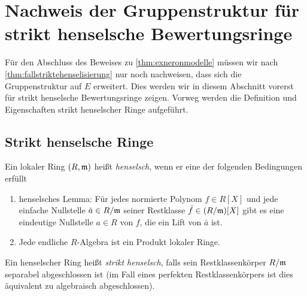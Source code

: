 \documentclass[german, bibliography=totoc]{scrreprt}
\renewcommand*{\optcite}[2][]{}
\begin{document}
\section[Gruppenstruktur für strikt henselsche Ringe]%
{Nachweis der Gruppenstruktur für strikt henselsche Bewertungsringe}
\label{chap:gruppestrikthenselsch}
Für den Abschluss des Beweises zu \ref{thm:exneronmodelle} müssen wir
nach \ref{thm:fallstriktehenselisierung} nur noch nachweisen, dass
sich die Gruppenstruktur auf $E$ erweitert.
Dies werden wir in diesem Abschnitt vorerst für strikt henselsche
Bewertungsringe zeigen. Vorweg werden die Definition und Eigenschaften
strikt henselscher Ringe aufgeführt.
\subsection{Strikt henselsche Ringe}
\begin{Definition}\label{def:henselscheringe}
  \optcite[2.3, Proposition 4]{neron}
  \optcite[Chapter IV.6]{silverman2}
  Ein lokaler Ring $(R,\mathfrak{m})$ heißt \emph{henselsch}, wenn
  er eine der folgenden Bedingungen erfüllt
  \begin{enumerate}[label=(\roman*)]
  \item henselsches Lemma:
    Für jedes normierte Polynom $f\in R[X]$ und jede einfache Nullstelle
    $\bar a\in R/\mathfrak{m}$ seiner Restklasse $\bar f\in (R/\mathfrak{m})[X]$
    gibt es eine eindeutige Nullstelle $a\in R$ von $f$, die ein Lift
    von $\bar a$ ist.
  \item Jede endliche $R$-Algebra ist ein Produkt lokaler Ringe.
  \end{enumerate}
  
  Ein henselscher Ring heißt \emph{strikt henselsch}, falls sein
  Restklassenkörper $R/\mathfrak{m}$ separabel abgeschlossen ist
  (im Fall eines perfekten Restklassenkörpers ist dies äquivalent zu
  algebraisch abgeschlossen).
\end{Definition}

  
\end{document}
